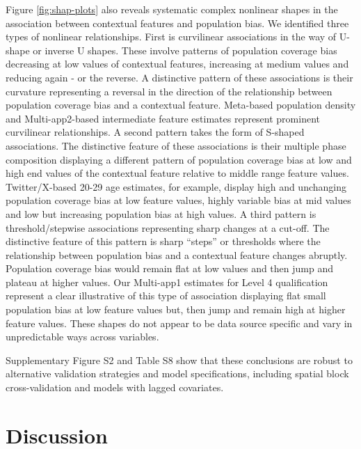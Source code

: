 \documentclass[]{rsos}%
\begin{document}
Figure \ref{fig:shap-plots} also reveals systematic complex nonlinear
shapes in the association between contextual features and population
bias. We identified three types of nonlinear relationships. First is
curvilinear associations in the way of U-shape or inverse U shapes.
These involve patterns of population coverage bias decreasing at low
values of contextual features, increasing at medium values and reducing
again - or the reverse. A distinctive pattern of these associations is
their curvature representing a reversal in the direction of the
relationship between population coverage bias and a contextual feature.
Meta-based population density and Multi-app2-based intermediate feature
estimates represent prominent curvilinear relationships. A second
pattern takes the form of S-shaped associations. The distinctive feature
of these associations is their multiple phase composition displaying a
different pattern of population coverage bias at low and high end values
of the contextual feature relative to middle range feature values.
Twitter/X-based 20-29 age estimates, for example, display high and
unchanging population coverage bias at low feature values, highly
variable bias at mid values and low but increasing population bias at
high values. A third pattern is threshold/stepwise associations
representing sharp changes at a cut-off. The distinctive feature of this
pattern is sharp ``steps'' or thresholds where the relationship between
population bias and a contextual feature changes abruptly. Population
coverage bias would remain flat at low values and then jump and plateau
at higher values. Our Multi-app1 estimates for Level 4 qualification
represent a clear illustrative of this type of association displaying
flat small population bias at low feature values but, then jump and
remain high at higher feature values. These shapes do not appear to be
data source specific and vary in unpredictable ways across variables.

Supplementary Figure S2 and Table S8 show that these conclusions are
robust to alternative validation strategies and model specifications,
including spatial block cross-validation and models with lagged
covariates.

\section{Discussion}\label{discussion}
\end{document}
